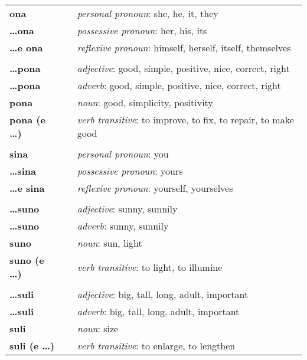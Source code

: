 \begin{supertabular}{p{2,5cm}|ll}
%
\textbf{ona} && \textit{personal pronoun}: she, he, it, they \\ %
\textbf{\dots ona} && \textit{possessive pronoun}: her, his, its \\  %
\textbf{\dots e ona} && \textit{reflexive pronoun}: himself, herself, itself, themselves \\  
 && \\ %
%  
\textbf{\dots pona} && \textit{adjective}: good, simple, positive, nice, correct, right \\ %
\textbf{\dots pona} && \textit{adverb}: good, simple, positive, nice, correct, right \\ %
\textbf{pona} && \textit{noun}: good, simplicity, positivity \\ %
\textbf{pona (e \dots)} && \textit{verb transitive}: to improve, to fix, to repair, to make good \\ %
 && \\ %
%
\textbf{sina} && \textit{personal pronoun}: you \\ %
\textbf{\dots sina} && \textit{possessive pronoun}: yours \\  %
\textbf{\dots e sina} && \textit{reflexive pronoun}: yourself, yourselves \\  
 && \\ %
%
\textbf{\dots suno} && \textit{adjective}: sunny, sunnily \\ %
\textbf{\dots suno} && \textit{adverb}: sunny, sunnily \\ %
\textbf{suno} && \textit{noun}: sun, light \\ %
\textbf{suno (e \dots)} && \textit{verb transitive}: to light, to illumine \\ %
 && \\ %
%
\textbf{\dots suli} && \textit{adjective}: big, tall, long, adult, important \\ %
\textbf{\dots suli} && \textit{adverb}: big, tall, long, adult, important \\ %
\textbf{suli} && \textit{noun}: size \\ %
\textbf{suli (e \dots)} && \textit{verb transitive}: to enlarge, to lengthen \\ %

\end{supertabular}
